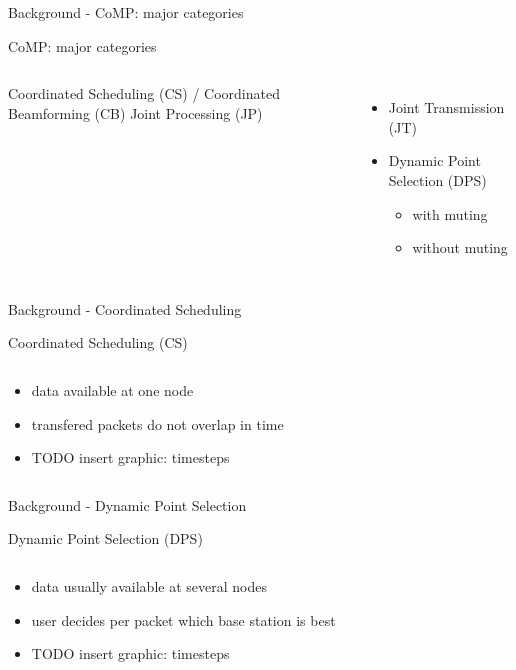 \documentclass[xcolor={cmyk}]{beamer}
\begin{document}
 \begin{frame}{Background - CoMP: major categories}
 	\begin{block}{CoMP: major categories}
		\begin{columns}
				Coordinated Scheduling (CS) / Coordinated Beamforming (CB)
			Joint Processing (JP)
				\begin{itemize}
					\item Joint Transmission (JT)
					\item Dynamic Point Selection (DPS)
					\begin{itemize}
						\item with muting
						\item without muting
					\end{itemize}
				\end{itemize}
		\end{columns}
	 \end{block}
 \end{frame}
 
 \begin{frame}{Background - Coordinated Scheduling}
 	\begin{block}{Coordinated Scheduling (CS)}
		\begin{columns}
			\begin{column}{.9\textwidth}
				\begin{itemize}
					\item data available at one node
					\item transfered packets do not overlap in time
					\item TODO insert graphic: timesteps
				\end{itemize}
			\end{column}
		\end{columns}
	 \end{block}
 \end{frame}

 \begin{frame}{Background - Dynamic Point Selection}
 	\begin{block}{Dynamic Point Selection (DPS)}
		\begin{columns}
			\begin{column}{.9\textwidth}
				\begin{itemize}
					\item data usually available at several nodes
					\item user decides per packet which base station is best
					\item TODO insert graphic: timesteps
				\end{itemize}
			\end{column}
		\end{columns}
	 \end{block}
 \end{frame}
 
\end{document}
